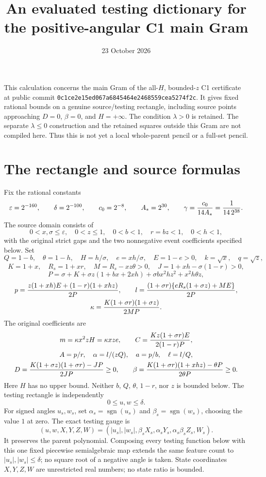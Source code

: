 \documentclass[11pt]{article}
\title{An evaluated testing dictionary for the positive-angular C1 main Gram}
\author{}\date{23 October 2026}
\newcommand{\eps}{\varepsilon}
\begin{document}
\maketitle

This calculation concerns the main Gram of the all-$H$, bounded-$z$
C1 certificate at public commit
\texttt{0c1ce2e15ed067a6845464e2468559cea5274f2c}.
It gives fixed rational bounds on a genuine source/testing rectangle,
including source points approaching $D=0$, $\beta=0$, and $H=+\infty$.
The condition $\lambda>0$ is retained. The separate $\lambda\le0$
construction and the retained squares outside this Gram are not
compiled here. Thus this is not yet a local whole-parent pencil or a
full-set pencil.

\section{The rectangle and source formulas}

Fix the rational constants
\[
 \eps=2^{-160},\qquad \delta=2^{-100},\qquad
 c_0=2^{-8},\qquad A_*=2^{30},\qquad
 \gamma={c_0\over14A_*}={1\over14\,2^{38}}.
\]
The source domain consists of
\[
 0<x,\sigma\le\eps,\quad 0<z\le1,\quad 0<b<1,
 \quad r=bz<1,\quad 0<h<1,
\]
with the original strict gaps and the two nonnegative event
coefficients specified below. Set
\[
 Q=1-b,\quad \theta=1-h,\quad H=h/\sigma,\quad e=xh/\sigma,
 \quad E=1-e>0,\quad k=\sqrt x,\quad q=\sqrt z,
\]
\[
 K=1+x,\quad R_s=1+xr,\quad M=R_s-xz\theta>0,
 \quad J=1+xh-\sigma(1-r)>0,
\]
\[
 P=\sigma+K+\sigma z(1+bx+2xh)
                  +\sigma bx^2hz^2+x^2h\theta z,
\]
\[
\begin{gathered}
 p={z(1+xh)E+(1-r)(1+xhz)\over2P},\qquad
 l={(1+\sigma r)\{eR_s(1+\sigma z)+ME\}\over2P},\\
 \kappa={K(1+\sigma r)(1+\sigma z)\over2MP}.
\end{gathered}
\]
The original coefficients are
\[
\begin{gathered}
 m=\kappa x^2zH=\kappa xze,\qquad
 C={Kz(1+\sigma r)E\over2(1-r)P},\\
 A=p/r,\quad \alpha=l/(zQ),\quad a=p/b,\quad \ell=l/Q,\\
 D={K(1+\sigma z)(1+\sigma r)-JP\over2JP}\ge0,\qquad
 \beta={K(1+\sigma r)(1+xhz)-\theta P\over2\theta P}\ge0.
\end{gathered}
\]
Here $H$ has no upper bound. Neither $b$, $Q$, $\theta$, $1-r$,
nor $z$ is bounded below. The testing rectangle is independently
\[
                  0\le u,w\le\delta.
\]
For signed angles $u_s,w_s$, set
$\alpha_s=\operatorname{sgn}(u_s)$ and
$\beta_s=\operatorname{sgn}(w_s)$, choosing the value $1$ at zero.
The exact testing gauge is
\[
 (u,w,X,Y,Z,W)=(|u_s|,|w_s|,\beta_sX_s,\alpha_sY_s,
                                \alpha_s\beta_sZ_s,W_s).
\]
It preserves the parent polynomial. Composing every testing function
below with this one fixed piecewise semialgebraic map extends the
same feature count to $|u_s|,|w_s|\le\delta$; no square root of a
negative angle is taken. State coordinates $X,Y,Z,W$ are unrestricted
real numbers; no state ratio is bounded.
\end{document}
